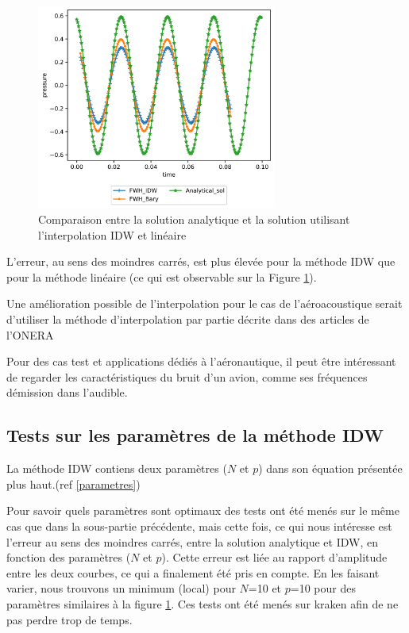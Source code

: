 \begin{figure}[H]
    \centering
    \includegraphics[width=0.70\textwidth]{images/onde_aac.png}
    \caption{Comparaison entre la solution analytique et la solution utilisant l'interpolation IDW et linéaire}
    \label{fig:onde_aac}
\end{figure}

L'erreur, au sens des moindres carrés, est plus élevée pour la méthode IDW que pour la méthode linéaire (ce qui est observable sur la Figure \ref{fig:onde_aac}).


Une amélioration possible de l'interpolation pour le cas de l'aéroacoustique serait d'utiliser la méthode d'interpolation par partie décrite dans des articles de l’ONERA\cite{cunha2011}\cite{cunha2016}

Pour des cas test et applications dédiés à l'aéronautique, il peut être intéressant de regarder les caractéristiques du bruit d'un avion, comme ses fréquences démission dans l'audible.\cite{frequence}

\subsection{Tests sur les paramètres de la méthode IDW}

La méthode IDW contiens deux paramètres (\(N\) et \(p\)) dans son équation présentée plus haut.(ref \ref{parametres})

Pour savoir quels paramètres sont optimaux des tests ont été menés sur le même cas que dans la sous-partie précédente, mais cette fois, ce qui nous intéresse est l'erreur au sens des moindres carrés, entre la solution analytique et IDW, en fonction des paramètres (\(N\) et \(p\)). Cette erreur est liée au rapport d'amplitude entre les deux courbes, ce qui a finalement été pris en compte. En les faisant varier, nous trouvons un minimum (local) pour \(N\)=10 et \(p\)=10 pour des paramètres similaires à la figure \ref{fig:onde_aac}.
Ces tests ont été menés sur kraken afin de ne pas perdre trop de temps.

